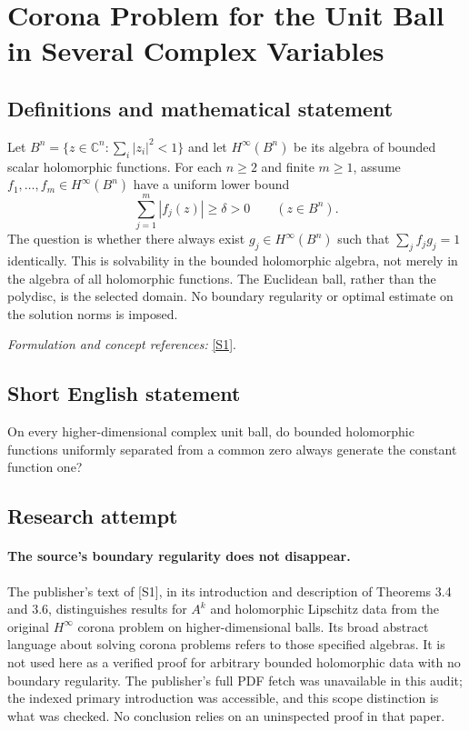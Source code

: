 \documentclass[11pt]{article}
\begin{document}
\section*{\texorpdfstring{Corona Problem for the Unit Ball in Several Complex Variables}{Corona Problem for the Unit Ball in Several Complex Variables}}\label{statement}
\subsection{Definitions and mathematical statement}
Let $B^n=\{z\in{\mathbb{C}}^n:\sum_i|z_i|^2<1\}$ and let $H^\infty(B^n)$ be its algebra of bounded scalar holomorphic functions. For each $n\ge2$ and finite $m\ge1$, assume $f_1,\ldots,f_m\in H^\infty(B^n)$ have a uniform lower bound
\[
 \sum_{j=1}^m|f_j(z)|\ge\delta>0\qquad(z\in B^n).
\]
The question is whether there always exist $g_j\in H^\infty(B^n)$ such that $\sum_j f_jg_j=1$ identically. This is solvability in the bounded holomorphic algebra, not merely in the algebra of all holomorphic functions. The Euclidean ball, rather than the polydisc, is the selected domain. No boundary regularity or optimal estimate on the solution norms is imposed.
\par\smallskip\textit{Formulation and concept references:} \href{https://revista-em.unex.es/index.php/EM/article/download/2411/2144/7535}{[S1]}.

\subsection{Short English statement}
On every higher-dimensional complex unit ball, do bounded holomorphic functions uniformly separated from a common zero always generate the constant function one?
\subsection{Research attempt}
\paragraph{The source's boundary regularity does not disappear.}
The publisher's text of [S1], in its introduction and description
of Theorems 3.4 and 3.6, distinguishes results for $A^k$ and
holomorphic Lipschitz data from the original $H^\infty$ corona
problem on higher-dimensional balls. Its broad abstract language
about solving corona problems refers to those specified algebras.
It is not used here as a verified proof for arbitrary bounded
holomorphic data with no boundary regularity. The publisher's full
PDF fetch was unavailable in this audit; the indexed primary
introduction was accessible, and this scope distinction is what
was checked. No conclusion relies on an uninspected proof in that
paper.
\end{document}
